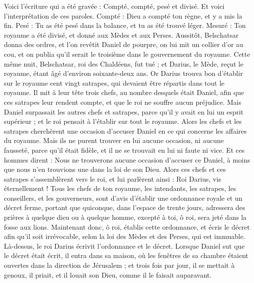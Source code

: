 \begin{multicols}{2}
Voici l'écriture qui a été gravée : Compté, compté, pesé et divisé.
Et voici l'interprétation de ces paroles. Compté : Dieu a compté ton règne, et y a mis la fin.
Pesé : Tu as été pesé dans la balance, et tu as été trouvé léger.
Mesuré : Ton royaume a été divisé, et donné aux Mèdes et aux Perses.
Aussitôt, Belschatsar donna des ordres, et l'on revêtit Daniel de pourpre, on lui mit un collier d'or au cou, et on publia qu'il serait le troisième dans le gouvernement du royaume.
Cette même nuit, Belschatsar, roi des Chaldéens, fut tué ;
et Darius, le Mède, reçut le royaume, étant âgé d'environ soixante-deux ans.
\VerseOne{}Or Darius trouva bon d'établir sur le royaume cent vingt satrapes, qui devaient être répartis dans tout le royaume.
Il mit à leur tête trois chefs, au nombre desquels était Daniel, afin que ces satrapes leur rendent compte, et que le roi ne souffre aucun préjudice.
Mais Daniel surpassait les autres chefs et satrapes, parce qu'il y avait en lui un esprit supérieur ; et le roi pensait à l'établir sur tout le royaume.
Alors les chefs et les satrapes cherchèrent une occasion d'accuser Daniel en ce qui concerne les affaires du royaume. Mais ils ne purent trouver en lui aucune occasion, ni aucune fausseté, parce qu'il était fidèle, et il ne se trouvait en lui ni faute ni vice.
Et ces hommes dirent : Nous ne trouverons aucune occasion d'accuser ce Daniel, à moins que nous n'en trouvions une dans la loi de son Dieu.
Alors ces chefs et ces satrapes s'assemblèrent vers le roi, et lui parlèrent ainsi : Roi Darius, vis éternellement !
Tous les chefs de ton royaume, les intendants, les satrapes, les conseillers, et les gouverneurs, sont d'avis d'établir une ordonnance royale et un décret ferme, portant que quiconque, dans l'espace de trente jours, adressera des prières à quelque dieu ou à quelque homme, excepté à toi, ô roi, sera jeté dans la fosse aux lions.
Maintenant donc, ô roi, établis cette ordonnance, et écris le décret afin qu'il soit irrévocable, selon la loi des Mèdes et des Perses, qui est immuable.
Là-dessus, le roi Darius écrivit l'ordonnance et le décret.
Lorsque Daniel sut que le décret était écrit, il entra dans sa maison, où les fenêtres de sa chambre étaient ouvertes dans la direction de Jérusalem ; et trois fois par jour, il se mettait à genoux, il priait, et il louait son Dieu, comme il le faisait auparavant.

\end{multicols}
